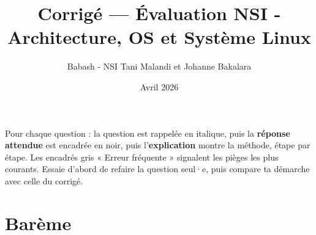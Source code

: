 \documentclass[addpoints, 11pt]{exam}
\title{Corrigé --- Évaluation NSI - Architecture, OS et Système Linux}
\author{Babash - NSI Tani Malandi et Johanne Bakalara}
\date{Avril 2026}
\DeclareRobustCommand{\_}{\textunderscore\allowbreak}
\begin{document}
\pagestyle{headandfoot}
\firstpageheader{}{}{}

\maketitle
\thispagestyle{headandfoot}

\begin{astuce}
Pour chaque question : la question est rappelée en italique, puis la \textbf{réponse attendue} est encadrée en noir, puis l'\textbf{explication} montre la méthode, étape par étape.
Les encadrés gris « Erreur fréquente » signalent les pièges les plus courants. Essaie d'abord de refaire la question seul·e, puis compare ta démarche avec celle du corrigé.
\end{astuce}

\section*{Barème}
\begin{center}
  \gradetable[h]
\end{center}
\end{document}
